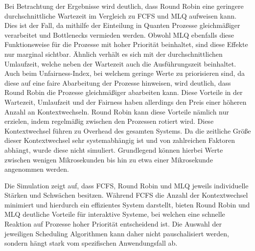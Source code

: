 Bei Betrachtung der Ergebnisse wird deutlich, dass Round Robin eine geringere durchschnittliche Wartezeit im Vergleich zu \ac{FCFS} und \ac{MLQ} aufweisen kann. Dies ist der Fall, da mithilfe der Einteilung in Quanten Prozesse gleichmäßiger verarbeitet und Bottlenecks vermieden werden. Obwohl \ac{MLQ} ebenfalls diese Funktionsweise für die Prozesse mit hoher Priorität beinhaltet, sind diese Effekte nur marginal sichtbar. Ähnlich verhält es sich mit der durchschnittlichen Umlaufzeit, welche neben der Wartezeit auch die Ausführungszeit beinhaltet. Auch beim Unfairness-Index, bei welchem geringe Werte zu priorisieren sind, da diese auf eine faire Abarbeitung der Prozesse hinweisen, wird deutlich, dass Round Robin die Prozesse gleichmäßiger abarbeiten kann. Diese Vorteile in der Wartezeit, Umlaufzeit und der Fairness haben allerdings den Preis einer höheren Anzahl an Kontextwechseln. Round Robin kann diese Vorteile nämlich nur erzielen, indem regelmäßig zwischen den Prozessen rotiert wird. Diese Kontextwechsel führen zu Overhead des gesamten Systems. Da die zeitliche Größe dieser Kontextwechsel sehr systemabhängig ist und von zahlreichen Faktoren abhängt, wurde diese nicht simuliert. Grundlegend können hierbei Werte zwischen wenigen Mikrosekunden bis hin zu etwa einer Mikrosekunde angenommen werden.

Die Simulation zeigt auf, dass \ac{FCFS}, Round Robin und \ac{MLQ} jeweils individuelle Stärken und Schwächen besitzen. Während \ac{FCFS} die Anzahl der Kontextwechsel minimiert und hierdurch ein effizientes System darstellt, bieten Round Robin und \ac{MLQ} deutliche Vorteile für interaktive Systeme, bei welchen eine schnelle Reaktion auf Prozesse hoher Priorität entscheidend ist. Die Auswahl der jeweiligen Scheduling Algorithmen kann daher nicht pauschalisiert werden, sondern hängt stark vom spezifischen Anwendungsfall ab.